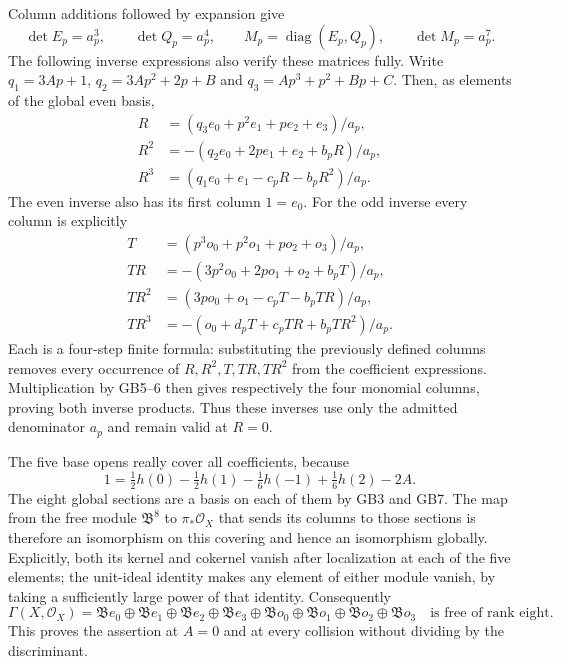 \documentclass[11pt]{article}
\newcommand{\diag}{\operatorname{diag}}
\begin{document}
Column additions followed by expansion give
\begin{equation}
 \det E_p=a_p^3,\qquad \det Q_p=a_p^4,\qquad
 M_p=\diag(E_p,Q_p),\qquad \det M_p=a_p^7.
 \tag{GB7}
\end{equation}
The following inverse expressions also verify these matrices
fully. Write $q_1=3Ap+1$, $q_2=3Ap^2+2p+B$ and
$q_3=Ap^3+p^2+Bp+C$. Then, as elements of the global
even basis,
\begin{equation}
 \begin{aligned}
 R&=(q_3e_0+p^2e_1+pe_2+e_3)/a_p,\\
 R^2&=-(q_2e_0+2pe_1+e_2+b_pR)/a_p,\\
 R^3&=(q_1e_0+e_1-c_pR-b_pR^2)/a_p .
 \end{aligned}
 \tag{GB8}
\end{equation}
The even inverse also has its first column $1=e_0$.
For the odd inverse every column is explicitly
\begin{equation}
 \begin{aligned}
 T&=(p^3o_0+p^2o_1+po_2+o_3)/a_p,\\
 TR&=-(3p^2o_0+2po_1+o_2+b_pT)/a_p,\\
 TR^2&=(3po_0+o_1-c_pT-b_pTR)/a_p,\\
 TR^3&=-(o_0+d_pT+c_pTR+b_pTR^2)/a_p .
 \end{aligned}
 \tag{GB9}
\end{equation}
Each is a four-step finite formula: substituting the
previously defined columns removes every occurrence of
$R,R^2,T,TR,TR^2$ from the coefficient expressions.
Multiplication by GB5--6 then gives respectively the
four monomial columns, proving both inverse products.
Thus these inverses use only the admitted denominator
$a_p$ and remain valid at $R=0$.

The five base opens really cover all coefficients, because
\[
 1=\tfrac12h(0)-\tfrac12h(1)-\tfrac16h(-1)
                         +\tfrac16h(2)-2A.
\]
The eight global sections are a basis on each of them by
GB3 and GB7. The map from the free module $\mathfrak B^8$
to $\pi_*\mathcal O_X$ that sends its columns to those
sections is therefore an isomorphism on this covering and
hence an isomorphism globally. Explicitly, both its kernel
and cokernel vanish after localization at each of the five
elements; the unit-ideal identity makes any element of either
module vanish, by taking a sufficiently large power of that
identity. Consequently
\begin{equation}
 \Gamma(X,\mathcal O_X)
 =\mathfrak B e_0\oplus\mathfrak B e_1\oplus
  \mathfrak B e_2\oplus\mathfrak B e_3
 \oplus\mathfrak B o_0\oplus\mathfrak B o_1\oplus
  \mathfrak B o_2\oplus\mathfrak B o_3
 \quad\text{is free of rank eight.}
 \tag{GB10}
\end{equation}
This proves the assertion at $A=0$ and at every collision
without dividing by the discriminant.
\end{document}
